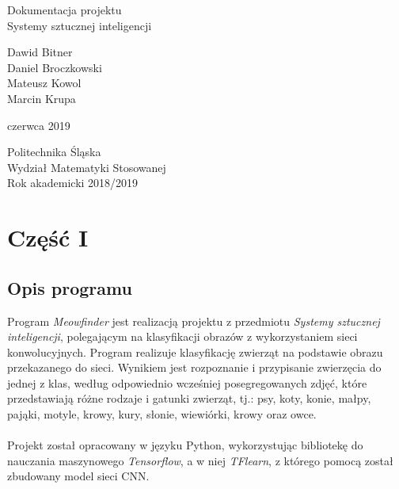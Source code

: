 \documentclass[12pt,a4paper]{article}
\begin{document}
    \begin{titlepage}
       \begin{center}
           \vspace*{1cm}
           
           {\fontsize{23}{25}\selectfont Dokumentacja projektu\\Systemy sztucznej inteligencji}
     
            \vspace{1.0cm}
        
            {\fontsize{17}{18}\selectfont Dawid Bitner \\ Daniel Broczkowski \\ Mateusz Kowol \\ Marcin Krupa}
           
            \vspace{0.4cm}
           
            {\fontsize{12}{13} czerwca 2019}
           
            \vfill
            \vspace{0.8cm}
     
            {\fontsize{13}{14}\selectfont Politechnika Śląska\\Wydział Matematyki Stosowanej\\Rok akademicki 2018/2019}
     
       \end{center}
    \end{titlepage}
	\newpage
	\tableofcontents
	\newpage
	\section{Część I}
	\subsection{Opis programu}

	Program \textit{Meowfinder} jest realizacją projektu z przedmiotu \textit{Systemy sztucznej inteligencji}, polegającym na klasyfikacji obrazów z wykorzystaniem sieci konwolucyjnych. Program realizuje klasyfikację zwierząt na podstawie obrazu przekazanego do sieci. Wynikiem jest rozpoznanie i przypisanie zwierzęcia do jednej z klas, według odpowiednio wcześniej posegregowanych zdjęć, które przedstawiają różne rodzaje i gatunki zwierząt, tj.: psy, koty, konie, małpy, pająki, motyle, krowy, kury, słonie, wiewiórki, krowy oraz owce.\\\\
	Projekt został opracowany w języku Python, wykorzystując bibliotekę do nauczania maszynowego \textit{Tensorflow}, a w niej \textit{TFlearn}, z którego pomocą został zbudowany model sieci CNN.
\end{document}

